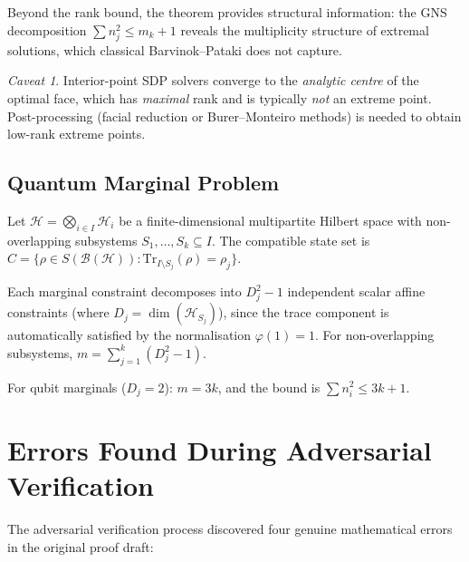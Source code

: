 \documentclass[11pt,a4paper]{article}
\theoremstyle{plain}
\theoremstyle{definition}
\theoremstyle{remark}
\newtheorem*{caveat*}{Caveat}
\newcommand{\Hilbert}{\mathcal{H}}
\newcommand{\BH}{\mathcal{B}(\Hilbert)}
\newcommand{\tr}{\mathrm{Tr}}
\begin{document}
Beyond the rank bound, the theorem provides structural information:
the GNS decomposition $\sum n_j^2 \le m_k + 1$ reveals the multiplicity
structure of extremal solutions, which classical Barvinok--Pataki
does not capture.

\begin{caveat*}
Interior-point SDP solvers converge to the \emph{analytic centre}
of the optimal face, which has \emph{maximal} rank and is typically
\emph{not} an extreme point. Post-processing (facial reduction or
Burer--Monteiro methods) is needed to obtain low-rank extreme points.
\end{caveat*}

\subsection{Quantum Marginal Problem}
\label{sec:quantum-marginals}

Let $\Hilbert = \bigotimes_{i \in I} \Hilbert_i$ be a finite-dimensional
multipartite Hilbert space with non-overlapping subsystems
$S_1, \ldots, S_k \subseteq I$. The compatible state set is
$C = \{\rho \in S(\BH) : \tr_{I \setminus S_j}(\rho) = \rho_j\}$.

Each marginal constraint decomposes into $D_j^2 - 1$ independent scalar
affine constraints (where $D_j = \dim(\Hilbert_{S_j})$), since the trace
component is automatically satisfied by the normalisation $\varphi(1) = 1$.
For non-overlapping subsystems, $m = \sum_{j=1}^k (D_j^2 - 1)$.

For qubit marginals ($D_j = 2$): $m = 3k$, and the bound is
$\sum n_i^2 \le 3k + 1$.


\section{Errors Found During Adversarial Verification}
\label{sec:errors}

The adversarial verification process discovered four genuine mathematical
errors in the original proof draft:
\end{document}
